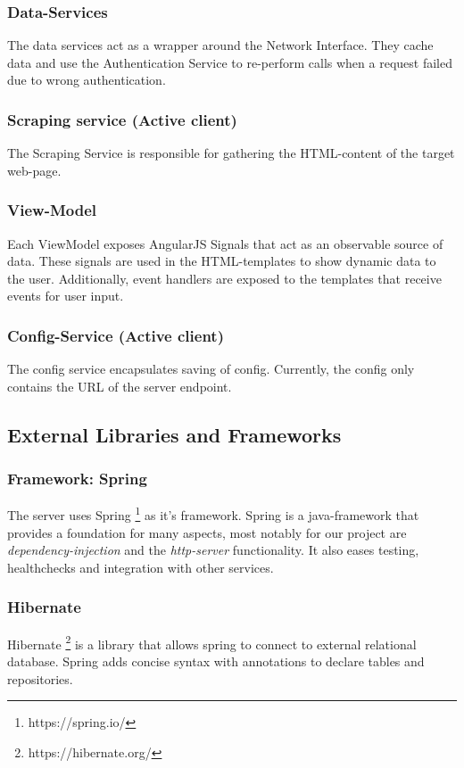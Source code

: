 \subsubsection{Data-Services}
The data services act as a wrapper around the Network Interface.
They cache data and use the Authentication Service to re-perform calls when a request failed due to wrong authentication.

\subsubsection{Scraping service (Active client)}
The Scraping Service is responsible for gathering the HTML-content of the target web-page.

\subsubsection{View-Model}
Each ViewModel exposes AngularJS Signals that act as an observable source of data.
These signals are used in the HTML-templates to show dynamic data to the user. \newline
Additionally, event handlers are exposed to the templates that receive events for user input.

\subsubsection{Config-Service (Active client)}
The config service encapsulates saving of config. \newline
Currently, the config only contains the URL of the server endpoint.

\subsection{External Libraries and Frameworks}\label{subsec:external-libraries-and-frameworks}
\subsubsection{Framework: Spring}
The server uses Spring \footnote{https://spring.io/} as it's framework.
Spring is a java-framework that provides a foundation for many aspects, most notably for our project are \textit{dependency-injection} and the \textit{http-server} functionality.
It also eases testing, healthchecks and integration with other services.

\subsubsection{Hibernate}
Hibernate \footnote{https://hibernate.org/} is a library that allows spring to connect to external relational database.
Spring adds concise syntax with annotations to declare tables and repositories.

